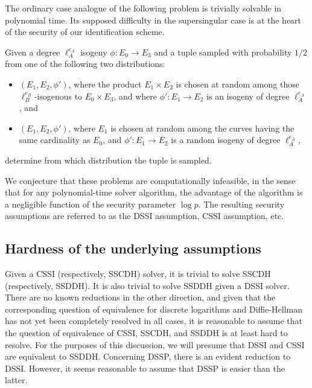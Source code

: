 \documentclass[jmc]{degruyter-journal-a}
\theoremstyle{definition}
\begin{document}
The ordinary case analogue of the following problem is trivially
solvable in polynomial time. Its supposed difficulty in the
supersingular case is at the heart of the security of our
identification scheme.

\begin{problem}
  Given a degree $\ell_A^{e_A}$ isogeny $\phi:E_0\to E_3$ and a
  tuple sampled with probability $1/2$ from one of the following two
  distributions:
  \begin{itemize} 
  \item $(E_1,E_2,\phi')$, where the product $E_1\times E_2$ is chosen
    at random among those $\ell_B^{e_B}$-isogenous to $E_0\times E_3$,
    and where $\phi':E_1\to E_2$ is an isogeny of degree
    $\ell_A^{e_A}$, and
  \item $(E_1,E_2,\phi')$, where $E_1$ is chosen at random among the
    curves having the same cardinality as $E_0$, and $\phi':E_1\to
    E_2$ is a random isogeny of degree $\ell_A^{e_A}$,
  \end{itemize}
  determine from which distribution the tuple is sampled.
\end{problem}

We conjecture that these problems are computationally infeasible, in
the sense that for any polynomial-time solver algorithm, the advantage
of the algorithm is a negligible function of the security parameter
$\log p$. The resulting security assumptions are referred to as the
DSSI assumption, CSSI assumption, etc.


\subsection{Hardness of the underlying
  assumptions}\label{subsec:hardness}

Given a CSSI (respectively, SSCDH) solver, it is trivial to solve
SSCDH (respectively, SSDDH). It is also trivial to solve SSDDH given a
DSSI solver. There are no known reductions in the other direction, and
given that the corresponding question of equivalence for discrete
logarithms and Diffie-Hellman has not yet been completely resolved in
all cases, it is reasonable to assume that the question of equivalence
of CSSI, SSCDH, and SSDDH is at least hard to resolve. For the
purposes of this discussion, we will presume that DSSI and CSSI are
equivalent to SSDDH. Concerning DSSP, there is an evident reduction to
DSSI. However, it seems reasonable to assume that DSSP is easier than the
latter.
\end{document}
